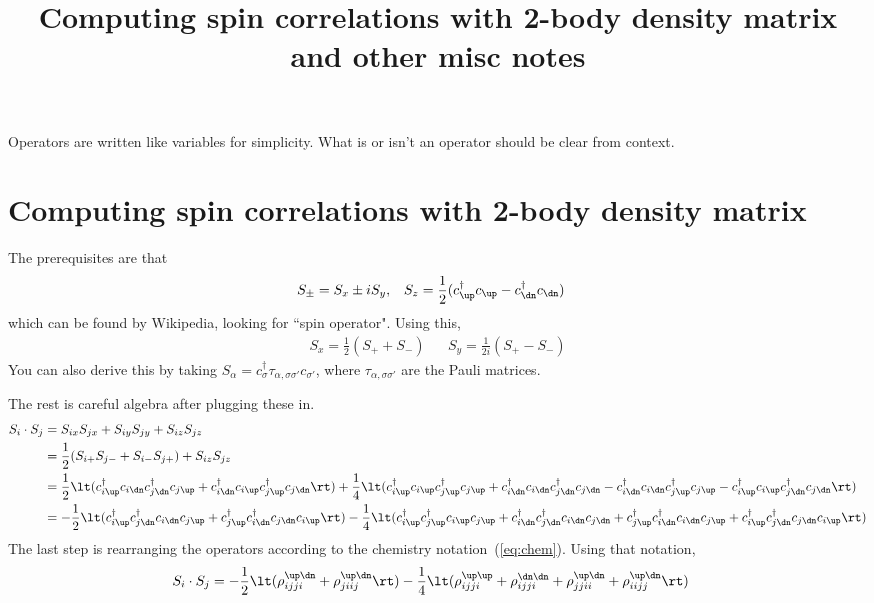 \documentclass[10pt]{article}
\begin{document}
\title{Computing spin correlations with 2-body density matrix\\ and other misc notes}
\maketitle

Operators are written like variables for simplicity. What is or isn't an operator should be clear from context.

\section{Computing spin correlations with 2-body density matrix}

The prerequisites are that 
\begin{align}
  &
  S_\pm = S_x \pm i S_y,
  &&
  S_z = \frac 12 (c_\up^\dag c_\up - c_\dn^\dag c_\dn)
  &
\end{align}
which can be found by Wikipedia, looking for ``spin operator". 
Using this, 
\begin{align}
  &
  S_x = \frac 12 (S_+ + S_-)
  &&
  S_y = \frac 1{2i} (S_+ - S_-)
  &
\end{align}
You can also derive this by taking $S_\alpha = c^\dag_\sigma \tau_{\alpha,\sigma\sigma'} c_{\sigma'}$, where $\tau_{\alpha,\sigma\sigma'}$ are the Pauli matrices.

The rest is careful algebra after plugging these in. 
\begin{align}
  S_i \cdot S_j
  &=
  S_{ix} S_{jx} 
  +
  S_{iy} S_{jy} 
  +
  S_{iz} S_{jz} 
  \\
  &=
  \frac 12 (
    S_{i+} S_{j-} + S_{i-} S_{j+}
  )
  + 
  S_{iz} S_{jz}
  \\
  &=
  \frac 12 \lt(
    c_{i\up}^\dag
    c_{i\dn}
    c_{j\dn}^\dag
    c_{j\up}
    +
    c_{i\dn}^\dag
    c_{i\up}
    c_{j\up}^\dag
    c_{j\dn}
  \rt)
  +
  \frac 14 \lt(
    c_{i\up}^\dag
    c_{i\up}
    c_{j\up}^\dag
    c_{j\up}
    +
    c_{i\dn}^\dag
    c_{i\dn}
    c_{j\dn}^\dag
    c_{j\dn}
    -
    c_{i\dn}^\dag
    c_{i\dn}
    c_{j\up}^\dag
    c_{j\up}
    -
    c_{i\up}^\dag
    c_{i\up}
    c_{j\dn}^\dag
    c_{j\dn}
  \rt)
  \\
  &=
  -\frac 12 \lt(
    c_{i\up}^\dag
    c_{j\dn}^\dag
    c_{i\dn}
    c_{j\up}
    +
    c_{j\up}^\dag
    c_{i\dn}^\dag
    c_{j\dn}
    c_{i\up}
  \rt)
  -
  \frac 14 \lt(
    c_{i\up}^\dag
    c_{j\up}^\dag
    c_{i\up}
    c_{j\up}
    +
    c_{i\dn}^\dag
    c_{j\dn}^\dag
    c_{i\dn}
    c_{j\dn}
    +
    c_{j\up}^\dag
    c_{i\dn}^\dag
    c_{i\dn}
    c_{j\up}
    +
    c_{i\up}^\dag
    c_{j\dn}^\dag
    c_{j\dn}
    c_{i\up}
  \rt)
\end{align}
The last step is rearranging the operators according to the chemistry notation~(\ref{eq:chem}).
Using that notation,
\begin{align}
  S_i \cdot S_j
  &=
  -\frac 12 \lt(
    \rho_{ijji}^{\up\dn}
    +
    \rho_{jiij}^{\up\dn}
  \rt)
  -
  \frac 14 \lt(
    \rho_{ijji}^{\up\up}
    +
    \rho_{ijji}^{\dn\dn}
    +
    \rho_{jjii}^{\up\dn}
    +
    \rho_{iijj}^{\up\dn}
  \rt)
\end{align}
\end{document}
